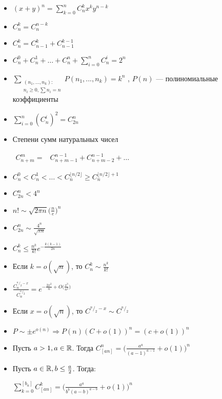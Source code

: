 \begin{itemize}
\item 
\( (x+y)^n=\sum \limits_{k=0}^n C^k_n x^k y^{n-k}  \)

\item 
$ C ^k _n = C^{n-k}_n $

\item 
$ C^ k _n = C^k _{n-1} + C^{k-1} _{n-1}$

\item 
$C^0_n + C^1_n + \dots + C^n_n + \sum \limits _{i=0} ^n {C^ i _n} = 2^n$

\item $ \sum  _{\substack{
     (n_1, ..., n_k): \\   
      n_i \geq 0, \sum n_i = n }}
    P(n_1, ..., n_k) = k^n$ , $P(n)$ --- полиномиальные коэффициенты
	
	
\item $\sum \limits _{i=0} ^n {(C^ i _n )^2 } = C^n _{2 n}$

\item Степени сумм натуральных чисел

\(
\begin{aligned}
C^m_{n+m} = &C^{n-1}_{n+m-1} + C^{n-1}_{n+m-2} + \dots 
\end{aligned}
\) 

\item
$C_n^0 < C_n^1 < \dots < C_n^{\lfloor  n/2\rfloor} \geq C_n^{\lfloor n/2\rfloor + 1} $

\item
$C^n_{2n} < 4^n$

\item
\( n! \sim \sqrt{2 \pi n} \bigg (\frac n e \bigg) ^n  \)

\item

$  C^n_{2n} \sim  \frac {4^n} {\sqrt{\pi n}} $


\item
$\displaystyle C^k_n  \leq \frac {n^k} {k!} e^{- \frac {k(k-1)} {2n} } $


\item
Если $k = o(\sqrt{n}) $, то $\displaystyle C^k_n \sim \frac {n^k} {k!}$

\item 
$\frac {C^{^n /_2-x}_n} {C^{^n /_2}_n} =  e^ {\displaystyle - \frac {2x^2} n +  O\bigg(\frac {x^3} {n^2}\bigg)} $




\item 
Если $x = o(\sqrt{n}) $, то $\displaystyle C^{\displaystyle^n /_2-x}\sim C^{\displaystyle^n /_2}$


\item 
$P \sim \pm e ^ {o(n)} \Rightarrow  P(n)(C + o(1) )^n = (c + o(1) ) ^n $

\item

Пусть $a > 1, a \in \mathbb{R}$. Тогда $ C ^n _ {[an]} = \bigg ( \frac {a ^a} {(a-1)^{a-1}} + o(1)\bigg)^n$

\item 
Пусть $a \in \mathbb{R}, b \leq \frac a 2$. Тогда:

$\sum \limits _{k=0} ^{[b_n]} C^k_{[an]} = \bigg( \frac  {a^a} {b^b(a-b)^{a-b}} + o(1)\bigg ) ^n $
\end{itemize}
